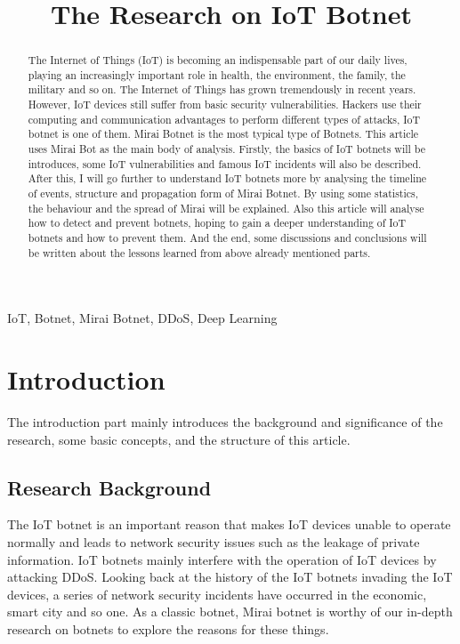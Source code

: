 \documentclass[conference]{IEEEtran}
\begin{document}
\title{The Research on IoT Botnet
\\
{}
}

\author{
}

\maketitle

\begin{abstract}
The Internet of Things (IoT) is becoming an indispensable part of our daily lives, playing an increasingly important role in health, the environment, the family, the military and so on. The Internet of Things has grown tremendously in recent years. However, IoT devices still suffer from basic security vulnerabilities. Hackers use their computing and communication advantages to perform different types of attacks, IoT botnet is one of them. Mirai Botnet is the most typical type of Botnets. This article uses Mirai Bot as the main body of analysis. Firstly, the basics of IoT botnets will be introduces, some IoT vulnerabilities and famous IoT incidents will also be described. After this, I will go further to understand IoT botnets more by analysing the timeline of events, structure and propagation form of Mirai Botnet. By using some statistics, the behaviour and the spread of Mirai will be explained. Also this article will analyse  how to detect and prevent botnets, hoping to gain a deeper understanding of IoT botnets and how to prevent them. And the end, some discussions and conclusions will be written about the lessons learned from above already mentioned parts.
\end{abstract}

\begin{IEEEkeywords}
IoT, Botnet, Mirai Botnet, DDoS, Deep Learning
\end{IEEEkeywords}

\section{\textbf{Introduction}}
The introduction part mainly introduces the background and significance of the research, some basic concepts, and the structure of this article.

\subsection{\textbf{Research Background}}
The IoT botnet is an important reason that makes IoT devices unable to operate normally and leads to network security issues such as the leakage of private information. IoT botnets mainly interfere with the operation of IoT devices by attacking DDoS. Looking back at the history of the IoT botnets invading the IoT devices, a series of network security incidents have occurred in the economic, smart city and so one. As a classic botnet, Mirai botnet is worthy of our in-depth research on botnets to explore the reasons for these things.
\end{document}
